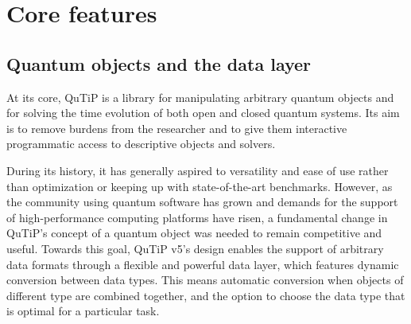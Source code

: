 \documentclass[preprint,3p,sort&compress]{elsarticle}
\begin{document}






\section{Core features}

\subsection{Quantum objects and the data layer}

At its core, QuTiP is a library for manipulating arbitrary quantum objects and for solving the time evolution of both open and closed quantum systems.
Its aim is to remove burdens from the researcher and to give them interactive programmatic access to descriptive objects and solvers. 

During its history, it has generally aspired to versatility and ease of use rather than optimization or keeping up with state-of-the-art benchmarks.  However, as the community using quantum software has grown and demands for the support of high-performance computing platforms have risen, a fundamental change in QuTiP's concept of a quantum object was needed to remain competitive and useful.  Towards this goal, QuTiP v5's design enables the support of arbitrary data formats through a flexible and powerful data layer, which features dynamic conversion between data types. This means automatic conversion when objects of different type are combined together, and the option to choose the data type that is optimal for a particular task. 
\end{document}
